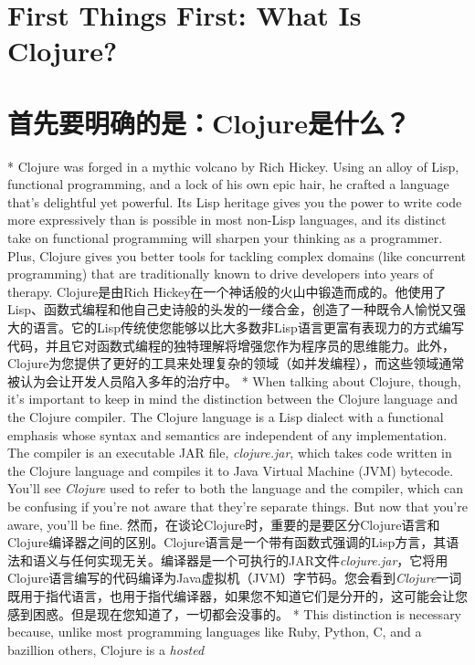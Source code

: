 \begin{paracol}{2}
\section{First Things First: What Is Clojure?}
\switchcolumn
\section{首先要明确的是：Clojure是什么？}
\switchcolumn[0]*
Clojure was forged in a mythic volcano by Rich Hickey. Using an alloy of
Lisp, functional programming, and a lock of his own epic hair, he
crafted a language that's delightful yet powerful. Its Lisp heritage
gives you the power to write code more expressively than is possible in
most non-Lisp languages, and its distinct take on functional programming
will sharpen your thinking as a programmer. Plus, Clojure gives you
better tools for tackling complex domains (like concurrent programming)
that are traditionally known to drive developers into years of therapy.
\switchcolumn
Clojure是由Rich Hickey在一个神话般的火山中锻造而成的。他使用了Lisp、函数式编程和他自己史诗般的头发的一缕合金，创造了一种既令人愉悦又强大的语言。它的Lisp传统使您能够以比大多数非Lisp语言更富有表现力的方式编写代码，并且它对函数式编程的独特理解将增强您作为程序员的思维能力。此外，Clojure为您提供了更好的工具来处理复杂的领域（如并发编程），而这些领域通常被认为会让开发人员陷入多年的治疗中。
\switchcolumn[0]*
When talking about Clojure, though, it's important to keep in mind the
distinction between the Clojure language and the Clojure compiler. The
Clojure language is a Lisp dialect with a functional emphasis whose
syntax and semantics are independent of any implementation. The compiler
is an executable JAR file, \emph{clojure.jar}, which takes code written
in the Clojure language and compiles it to Java Virtual Machine (JVM)
bytecode. You'll see \emph{Clojure} used to refer to both the language
and the compiler, which can be confusing if you're not aware that
they're separate things. But now that you're aware, you'll be fine.
\switchcolumn
然而，在谈论Clojure时，重要的是要区分Clojure语言和Clojure编译器之间的区别。Clojure语言是一个带有函数式强调的Lisp方言，其语法和语义与任何实现无关。编译器是一个可执行的JAR文件\emph{clojure.jar}，它将用Clojure语言编写的代码编译为Java虚拟机（JVM）字节码。您会看到\emph{Clojure}一词既用于指代语言，也用于指代编译器，如果您不知道它们是分开的，这可能会让您感到困惑。但是现在您知道了，一切都会没事的。
\switchcolumn[0]*
This distinction is necessary because, unlike most programming languages
like Ruby, Python, C, and a bazillion others, Clojure is a \emph{hosted
}
\end{paracol}
